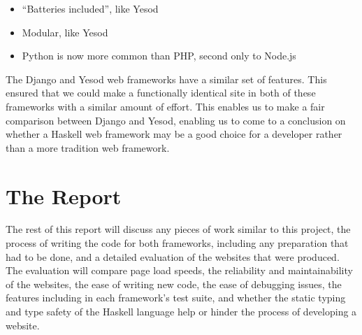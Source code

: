 \begin{itemize}
  \item ``Batteries included'', like Yesod
  \item Modular, like Yesod
  \item Python is now more common than PHP, second only to Node.js \parencite{djangoBookReasons}
\end{itemize}

The Django and Yesod web frameworks have a similar set of features. This ensured that we could
make a functionally identical site in both of these frameworks with a similar 
amount of effort. This enables us to make a fair comparison between Django and Yesod, enabling
us to come to a conclusion on whether a Haskell web framework may be a good choice for a 
developer rather than a more tradition web framework.

\section{The Report}

The rest of this report will discuss any pieces of work similar to this project, the process of
writing the code for both frameworks, including any preparation that had to be done, and a detailed
evaluation of the websites that were produced. The evaluation will compare page load speeds,
the reliability and maintainability of the websites, the ease of writing new code, the ease of
debugging issues, the features including in each framework's test suite, and whether the static typing
and type safety of the Haskell language help or hinder the process of developing a website.